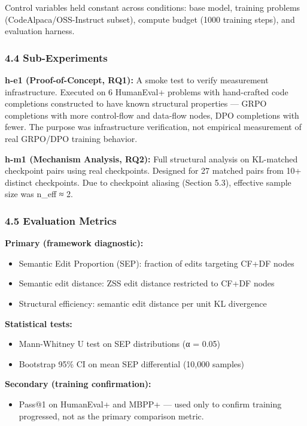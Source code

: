 Control variables held constant across conditions: base model, training problems (CodeAlpaca/OSS-Instruct subset), compute budget (1000 training steps), and evaluation harness.

\subsubsection{4.4 Sub-Experiments}

\textbf{h-e1 (Proof-of-Concept, RQ1):} A smoke test to verify measurement infrastructure. Executed on 6 HumanEval+ problems with hand-crafted code completions constructed to have known structural properties — GRPO completions with more control-flow and data-flow nodes, DPO completions with fewer. The purpose was infrastructure verification, not empirical measurement of real GRPO/DPO training behavior.

\textbf{h-m1 (Mechanism Analysis, RQ2):} Full structural analysis on KL-matched checkpoint pairs using real checkpoints. Designed for 27 matched pairs from 10+ distinct checkpoints. Due to checkpoint aliasing (Section 5.3), effective sample size was n_eff ≈ 2.

\subsubsection{4.5 Evaluation Metrics}

\textbf{Primary (framework diagnostic):}
\begin{itemize}
\item Semantic Edit Proportion (SEP): fraction of edits targeting CF+DF nodes
\item Semantic edit distance: ZSS edit distance restricted to CF+DF nodes
\item Structural efficiency: semantic edit distance per unit KL divergence
\end{itemize}

\textbf{Statistical tests:}
\begin{itemize}
\item Mann-Whitney U test on SEP distributions (α = 0.05)
\item Bootstrap 95\% CI on mean SEP differential (10,000 samples)
\end{itemize}

\textbf{Secondary (training confirmation):}
\begin{itemize}
\item Pass@1 on HumanEval+ and MBPP+ — used only to confirm training progressed, not as the primary comparison metric.
\end{itemize}
